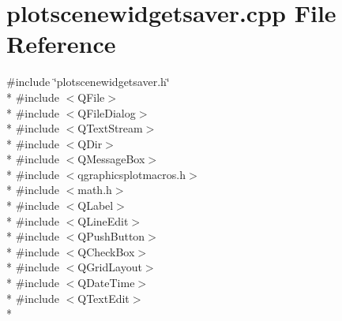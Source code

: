 \section{plotscenewidgetsaver.\+cpp File Reference}
\label{plotsaver_2plotscenewidgetsaver_8cpp}
{\ttfamily \#include \char`\"{}plotscenewidgetsaver.\+h\char`\"{}}\\*
{\ttfamily \#include $<$Q\+File$>$}\\*
{\ttfamily \#include $<$Q\+File\+Dialog$>$}\\*
{\ttfamily \#include $<$Q\+Text\+Stream$>$}\\*
{\ttfamily \#include $<$Q\+Dir$>$}\\*
{\ttfamily \#include $<$Q\+Message\+Box$>$}\\*
{\ttfamily \#include $<$qgraphicsplotmacros.\+h$>$}\\*
{\ttfamily \#include $<$math.\+h$>$}\\*
{\ttfamily \#include $<$Q\+Label$>$}\\*
{\ttfamily \#include $<$Q\+Line\+Edit$>$}\\*
{\ttfamily \#include $<$Q\+Push\+Button$>$}\\*
{\ttfamily \#include $<$Q\+Check\+Box$>$}\\*
{\ttfamily \#include $<$Q\+Grid\+Layout$>$}\\*
{\ttfamily \#include $<$Q\+Date\+Time$>$}\\*
{\ttfamily \#include $<$Q\+Text\+Edit$>$}\\*
